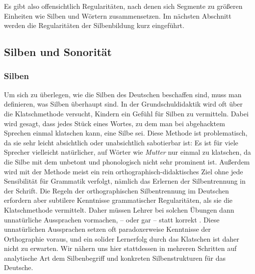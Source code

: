 
Es gibt also offensichtlich Regularitäten, nach denen sich Segmente zu größeren Einheiten wie Silben und Wörtern zusammensetzen.
Im nächsten Abschnitt werden die Regularitäten der Silbenbildung kurz eingeführt.

\subsection{Silben und Sonorität}

\label{sec:silben}

\subsubsection{Silben}


Um sich zu überlegen, wie die Silben des Deutschen beschaffen sind, muss man definieren, was Silben überhaupt sind.
In der Grundschuldidaktik wird oft über die Klatschmethode versucht, Kindern ein Gefühl für Silben zu vermitteln.
Dabei wird gesagt, dass jedes Stück eines Wortes, zu dem man bei abgehacktem Sprechen einmal klatschen kann, eine Silbe sei.
Diese Methode ist problematisch, da sie sehr leicht absichtlich oder unabsichtlich sabotierbar ist:
Es ist für viele Sprecher vielleicht natürlicher, auf Wörter wie \textit{Mutter} \textipa{[mUt5]} nur einmal zu klatschen, da die Silbe mit dem \textipa{[5]} unbetont und phonologisch nicht sehr prominent ist.
Außerdem wird mit der Methode meist ein rein orthographisch-didaktisches Ziel ohne jede Sensibilität für Grammatik verfolgt, nämlich das Erlernen der Silbentrennung in der Schrift.
Die Regeln der orthographischen Silbentrennung im Deutschen erfordern aber subtilere Kenntnisse grammatischer Regularitäten, als sie die Klatschmethode vermittelt.
Daher müssen Lehrer bei solchen Übungen dann unnatürliche Aussprachen vormachen, \zB \textipa{[mut]} -- \textipa{[ta]} oder gar \textipa{[mut]} -- \textipa{[tEK]} statt korrekt \textipa{[mUt5]}.
Diese unnatürlichen Aussprachen setzen oft paradoxerweise Kenntnisse der Orthographie voraus, und ein solider Lernerfolg durch das Klatschen ist daher nicht zu erwarten.
Wir nähern uns hier stattdessen in mehreren Schritten auf analytische Art dem Silbenbegriff und konkreten Silbenstrukturen für das Deutsche.

